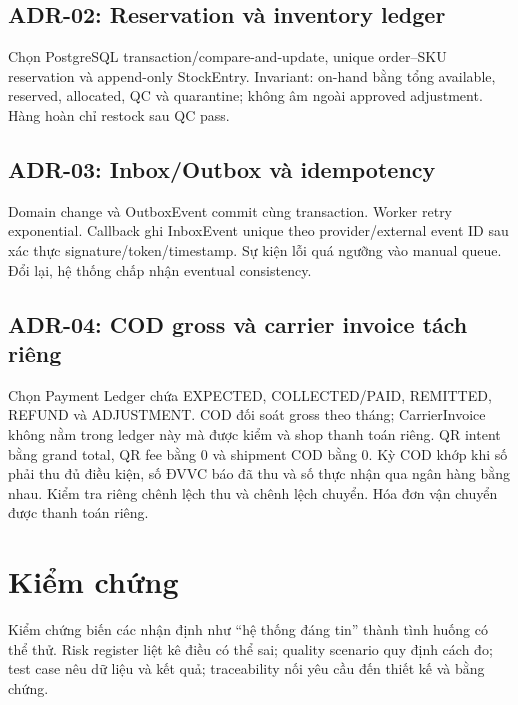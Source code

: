 \documentclass[12pt,a4paper]{report}
\begin{document}
\section{ADR-02: Reservation và inventory ledger}
Chọn PostgreSQL transaction/compare-and-update, unique order--SKU reservation và append-only StockEntry. Invariant: on-hand bằng tổng available, reserved, allocated, QC và quarantine; không âm ngoài approved adjustment. Hàng hoàn chỉ restock sau QC pass.

\section{ADR-03: Inbox/Outbox và idempotency}
Domain change và OutboxEvent commit cùng transaction. Worker retry exponential. Callback ghi InboxEvent unique theo provider/external event ID sau xác thực signature/token/timestamp. Sự kiện lỗi quá ngưỡng vào manual queue. Đổi lại, hệ thống chấp nhận eventual consistency.

\section{ADR-04: COD gross và carrier invoice tách riêng}
Chọn Payment Ledger chứa EXPECTED, COLLECTED/PAID, REMITTED, REFUND và ADJUSTMENT. COD đối soát gross theo tháng; CarrierInvoice không nằm trong ledger này mà được kiểm và shop thanh toán riêng. QR intent bằng grand total, QR fee bằng 0 và shipment COD bằng 0. Kỳ COD khớp khi số phải thu đủ điều kiện, số ĐVVC báo đã thu và số thực nhận qua ngân hàng bằng nhau. Kiểm tra riêng chênh lệch thu và chênh lệch chuyển. Hóa đơn vận chuyển được thanh toán riêng.

\chapter{Kiểm chứng}

Kiểm chứng biến các nhận định như ``hệ thống đáng tin'' thành tình huống có thể thử. Risk register liệt kê điều có thể sai; quality scenario quy định cách đo; test case nêu dữ liệu và kết quả; traceability nối yêu cầu đến thiết kế và bằng chứng.
\end{document}
